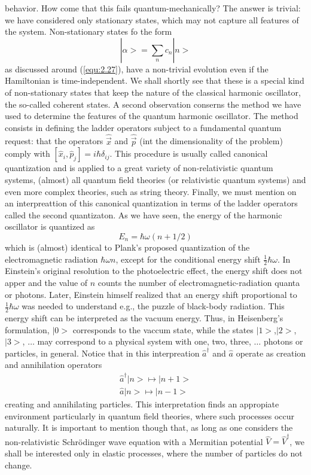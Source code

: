 behavior. How come that this fails quantum-mechanically? The
answer is trivial: we have considered only stationary
states, which may not capture all features of the system.
Non-stationary states fo the form
\begin{equation}
  |\alpha> = \sum_n c_n |n>
  \label{equ:2.105}
\end{equation}
as discussed around (\ref{equ:2.27}), have a non-trivial
evolution even if the Hamiltonian is time-independent. We
shall shortly see that these is a special kind of
non-stationary states that keep the nature of the classical
harmonic oscillator, the so-called coherent states.
A second observation conserns the method we have used to
determine the features of the quantum harmonic oscillator.
The method consists in defining the ladder operators subject
to a fundamental quantum request: that the operators
$\hat{\vec{x}}$ and $\hat{\vec{p}}$ (int the dimensionality
of the problem) comply with $[\hat{x}_i, \hat{p}_j] = i
\hbar \delta_{ij}$. This procedure is usually called
canonical quantization and is applied to a great variety of
non-relativistic quantum systems, (almost) all quantum field
theories (or relativistic quantum systems) and even more
complex theories, such as string theory.
Finally, we must mention on an interpreattion of this
canonical quantization in terms of the ladder operators
called the second quantizaton. As we have seen, the energy
of the harmonic oscillator is quantized as
$$
E_n = \hbar\omega(n + 1/2)
$$
which is (almost) identical to Plank's proposed quantization
of the electromagnetic radiation $\hbar\omega n$, except for
the conditional energy shift $\frac{1}{2}\hbar\omega$. In
Einstein's original resolution to the photoelectric effect,
the energy shift does not apper and the value of $n$ counts
the number of electromagnetic-radiation quanta or photons.
Later, Einstein himself realized that an energy shift
proportional to $\frac{1}{2} \hbar \omega$ was needed to
understand e.g., the puzzle of black-body radiation. This
energy shift can be interpreted as the vacuum energy. Thus,
in Heisenberg's formulation, $|0>$ corresponds to the vaccum
state, while the states $|1>$,$|2>$, $|3>$, $\ldots$ may
correspond to a physical system with one, two, three,
$\ldots$ photons or particles, in general. Notice that in
this interpreation $\hat{a}^{\dagger}$ and $\hat{a}$ operate
as creation and annihilation operators
\begin{align}
  \hat{a}^{\dagger} |n> \mapsto |n+1> \nonumber\\
  \hat{a} |n> \mapsto |n-1> \nonumber
\end{align}
creating and annihilating particles. This interpretation
finds an appropiate environment particularly in quantum
field theories, where such processes
occur naturally. It is important to mention though that, as
long as one considers the non-relativistic Schrödinger wave
equation with a Mermitian potential $\hat{V} =
\hat{V}^{\dagger}$, we shall be interested only in elastic
processes, where the number of particles do not change.
